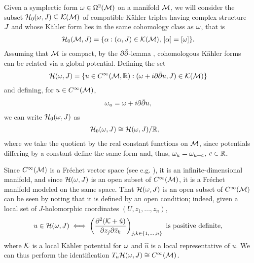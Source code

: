 \documentclass[notas.tex]{subfiles}
\begin{document}
Given a symplectic form $\omega \in \Omega^2(\mathcal{M})$ on a manifold $\mathcal{M}$, we will consider the subset $\mathcal{H}_0(\omega, J) \subseteq \mathcal{K}(\mathcal{M})$ of compatible Kähler triples having complex structure $J$ and whose Kähler form lies in the same cohomology class as $\omega$, that is
\begin{align*}
	\mathcal{H}_0(\mathcal{M}, J) = \{\alpha : (\alpha,J) \in \mathcal{K}(\mathcal{M}), \, [\alpha] = [\omega]\}.
\end{align*}
Assuming that $\mathcal{M}$ is compact, by the $\partial \bar{\partial}$-lemma \cite[Corollary 3.2.10]{huybrechts_complex_2005}, cohomologous Kähler forms can be related via a global potential. Defining the set 
\begin{align*}
	\mathcal{H}(\omega, J) = \{u \in C^\infty(\mathcal{M},\mathbb{R}): (\omega + i \partial \bar{\partial} u, J) \in \mathcal{K}(\mathcal{M}) \} 
\end{align*}
and defining, for $u \in C^\infty(\mathcal{M})$,
\begin{align}\label{eq_distorted_form}
	\omega_u =  \omega + i \partial \bar{\partial} u,
\end{align}
we can write $\mathcal{H}_0(\omega, J)$ as
\begin{align*}
	\mathcal{H}_0(\omega, J) &\cong \mathcal{H}(\omega, J) / \mathbb{R},
\end{align*}
where we take the quotient by the real constant functions on $\mathcal{M}$, since potentials differing by a constant define the same form and, thus, $\omega_u = \omega_{u+c}$, $c \in \mathbb{R}$.
\begin{rem}
	Since $C^\infty(\mathcal{M})$ is a Fréchet vector space (see e.g. \cite[Definition 2.4]{conway_course_1990}), it is an infinite-dimensional manifold, and since $\mathcal{H}(\omega, J)$ is an open subset of $C^\infty(\mathcal{M})$, it is a Fréchet manifold modeled on the same space. That $\mathcal{H}(\omega, J)$ is an open subset of $C^\infty(\mathcal{M})$ can be seen by noting that it is defined by an open condition; indeed, given a local set of $J$-holomorphic coordinates $(U, z_1,...,z_n)$,
\begin{align*}
	u \in \mathcal{H}(\omega, J) \iff \left( \frac{\partial^2 (\mathcal{K} + \hat u)}{\partial z_j \partial \bar z_k} \right)_{j,k \in \{1,...,n\}} \text{ is positive definite},
\end{align*}
where $\mathcal{K}$ is a local Kähler potential for $\omega$ and $\hat u$ is a local representative of $u$. We can thus perform the identification $T_u \mathcal{H}(\omega, J) \cong C^\infty(\mathcal{M})$.
\end{rem}
\end{document}
